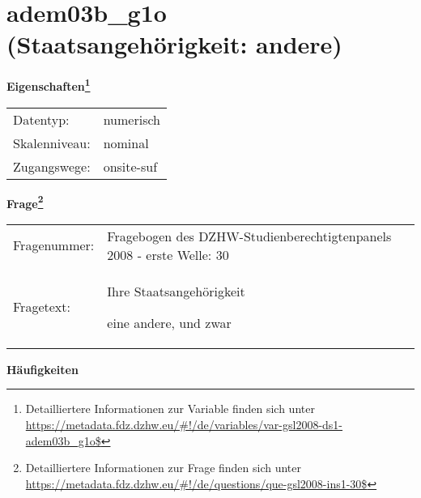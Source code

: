 
    \setcounter{footnote}{0}

    \vspace*{-1.8cm}
	\section{adem03b\_g1o (Staatsangehörigkeit: andere)}
	\label{section:adem03b_g1o}



    \vspace*{0.5cm}
    \noindent\textbf{Eigenschaften\footnote{Detailliertere Informationen zur Variable finden sich unter
		\url{https://metadata.fdz.dzhw.eu/\#!/de/variables/var-gsl2008-ds1-adem03b_g1o$}}}\\
	\begin{tabularx}{\hsize}{@{}lX}
	Datentyp: & numerisch \\
	Skalenniveau: & nominal \\
	Zugangswege: &
	  onsite-suf
 \\
    \end{tabularx}



				\vspace*{0.5cm}
                \noindent\textbf{Frage\footnote{Detailliertere Informationen zur Frage finden sich unter
		              \url{https://metadata.fdz.dzhw.eu/\#!/de/questions/que-gsl2008-ins1-30$}}}\\
				\begin{tabularx}{\hsize}{@{}lX}
					Fragenummer: &
					  Fragebogen des DZHW-Studienberechtigtenpanels 2008 - erste Welle:
					  30
 \\
					Fragetext: & Ihre Staatsangehörigkeit\par  eine andere, und zwar \\
				\end{tabularx}





        		\vspace*{0.5cm}
                \noindent\textbf{Häufigkeiten}

